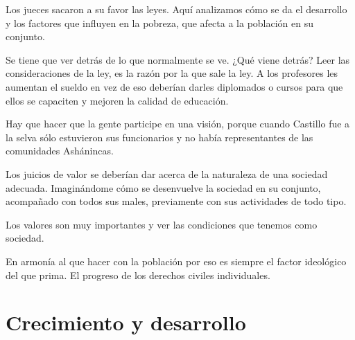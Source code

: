 \documentclass[
  a4paper,
]{article}
\begin{document}
Los jueces sacaron a su favor las leyes. Aquí analizamos cómo se da el
desarrollo y los factores que influyen en la pobreza, que afecta a la
población en su conjunto.

Se tiene que ver detrás de lo que normalmente se ve. ¿Qué viene detrás?
Leer las consideraciones de la ley, es la razón por la que sale la ley.
A los profesores les aumentan el sueldo en vez de eso deberían darles
diplomados o cursos para que ellos se capaciten y mejoren la calidad de
educación.

Hay que hacer que la gente participe en una visión, porque cuando
Castillo fue a la selva sólo estuvieron sus funcionarios y no había
representantes de las comunidades Ashánincas.

Los juicios de valor se deberían dar acerca de la naturaleza de una
sociedad adecuada. Imaginándome cómo se desenvuelve la sociedad en su
conjunto, acompañado con todos sus males, previamente con sus
actividades de todo tipo.

Los valores son muy importantes y ver las condiciones que tenemos como
sociedad.

En armonía al que hacer con la población por eso es siempre el factor
ideológico del que prima. El progreso de los derechos civiles
individuales.

\hypertarget{crecimiento-y-desarrollo}{%
\section{Crecimiento y desarrollo}\label{crecimiento-y-desarrollo}}
\end{document}
